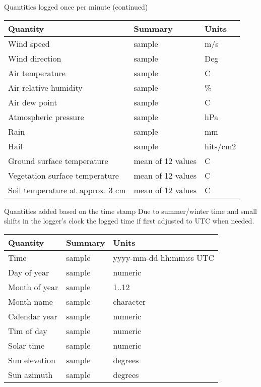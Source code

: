 \documentclass[
  ignorenonframetext,
]{beamer}
\begin{document}
\begin{frame}{Quantities logged once per minute (continued)}
\protect\hypertarget{quantities-logged-once-per-minute-continued}{}
\begin{longtable}[]{@{}lll@{}}
\toprule
Quantity & Summary & Units \\
\midrule
\endhead
Wind speed & sample & m/s \\
Wind direction & sample & Deg \\
Air temperature & sample & C \\
Air relative humidity & sample & \% \\
Air dew point & sample & C \\
Atmospheric pressure & sample & hPa \\
Rain & sample & mm \\
Hail & sample & hits/cm2 \\
Ground surface temperature & mean of 12 values & C \\
Vegetation surface temperature & mean of 12 values & C \\
Soil temperature at approx. 3 cm & mean of 12 values & C \\
\bottomrule
\end{longtable}
\end{frame}

\begin{frame}{Quantities added based on the time stamp}
\protect\hypertarget{quantities-added-based-on-the-time-stamp}{}
Due to summer/winter time and small shifts in the logger's clock the
logged time if first adjusted to UTC when needed.

\begin{longtable}[]{@{}lll@{}}
\toprule
Quantity & Summary & Units \\
\midrule
\endhead
Time & sample & yyyy-mm-dd hh:mm:ss UTC \\
Day of year & sample & numeric \\
Month of year & sample & 1..12 \\
Month name & sample & character \\
Calendar year & sample & numeric \\
Tim of day & sample & numeric \\
Solar time & sample & numeric \\
Sun elevation & sample & degrees \\
Sun azimuth & sample & degrees \\
\bottomrule
\end{longtable}
\end{frame}
\end{document}
